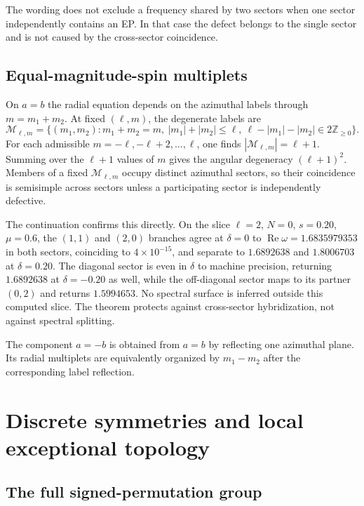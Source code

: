 \documentclass[10pt]{article}
\theoremstyle{plain}
\newcommand{\Rey}{\operatorname{Re}}
\begin{document}
The wording does not exclude a frequency shared by two sectors when one sector
independently contains an EP. In that case the defect belongs to the single
sector and is not caused by the cross-sector coincidence.

\subsection{Equal-magnitude-spin multiplets}

On $a=b$ the radial equation depends on the azimuthal labels through
$m=m_1+m_2$. At fixed $(\ell,m)$, the degenerate labels are
\begin{equation}
\mathcal{M}_{\ell,m}=\bigl\{(m_1,m_2):m_1+m_2=m,\ |m_1|+|m_2|\leq\ell,\
\ell-|m_1|-|m_2|\in2\mathbb{Z}_{\geq0}\bigr\}.
\end{equation}
For each admissible $m=-\ell,-\ell+2,\dots,\ell$, one finds
$|\mathcal{M}_{\ell,m}|=\ell+1$. Summing over the $\ell+1$ values of $m$ gives
the angular degeneracy $(\ell+1)^2$. Members of a fixed $\mathcal{M}_{\ell,m}$
occupy distinct azimuthal sectors, so their coincidence is semisimple across
sectors unless a participating sector is independently defective.

The continuation confirms this directly. On the slice $\ell=2$, $N=0$,
$s=0.20$, $\mu=0.6$, the $(1,1)$ and $(2,0)$ branches agree at $\delta=0$ to
$\Rey\omega=1.6835979353$ in both sectors, coinciding to $4\times10^{-15}$,
and separate to $1.6892638$ and $1.8006703$ at $\delta=0.20$. The diagonal
sector is even in $\delta$ to machine precision, returning $1.6892638$ at
$\delta=-0.20$ as well, while the off-diagonal sector maps to its partner
$(0,2)$ and returns $1.5994653$. No spectral surface is inferred outside this
computed slice. The theorem protects against cross-sector hybridization, not
against spectral splitting.

The component $a=-b$ is obtained from $a=b$ by reflecting one azimuthal plane.
Its radial multiplets are equivalently organized by $m_1-m_2$ after the
corresponding label reflection.

\section{Discrete symmetries and local exceptional topology}

\subsection{The full signed-permutation group}
\end{document}
